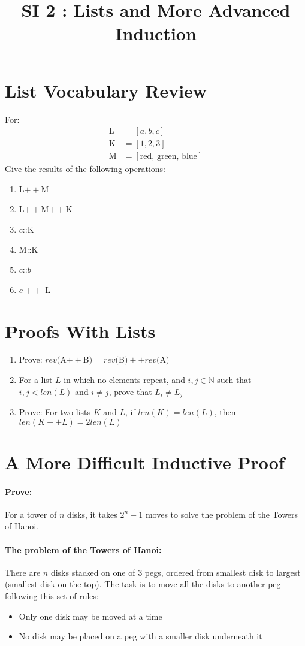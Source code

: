\documentclass[12pt]{article}
\title{SI 2 : Lists and More Advanced Induction}
\author{}
\date{}
\begin{document}
	\maketitle
	\section{List Vocabulary Review}
	For:
	\begin{align*}
		\text{L} &= [a,b,c]\\
		\text{K} &= [1,2,3]\\
		\text{M} &= [\text{red, green, blue}]
	\end{align*}
	Give the results of the following operations:
	\begin{enumerate}
		\item L$++$M
		\item L$++$M$++$K
		\item $c$::K
		\item M::K
		\item $c$::$b$
		\item $c$ $++$ L
	\end{enumerate}
	\section{Proofs With Lists}
	\begin{enumerate}[resume]
		\item Prove: $rev($A$++$B$) = rev($B$)++rev($A$)$
		\item For a list $L$ in which no elements repeat, and $i,j \in \mathbb{N}$ such that $i,j < len(L)$ and $i \neq j$, prove that $L_i \neq L_j$
		\item Prove: For two lists $K$ and $L$, if $len(K)=len(L)$, then $len(K++L) = 2len(L)$
	\end{enumerate}
	\section{A More Difficult Inductive Proof}
	\paragraph{Prove:} For a tower of $n$ disks, it takes $2^n-1$ moves to solve the problem of the Towers of Hanoi.\newline
	\paragraph{The problem of the Towers of Hanoi:} There are $n$ disks stacked on one of 3 pegs, ordered from smallest disk to largest (smallest disk on the top). The task is to move all the disks to another peg following this set of rules:
	\begin{itemize}
		\item Only one disk may be moved at a time
		\item No disk may be placed on a peg with a smaller disk underneath it
	\end{itemize}
\end{document}
